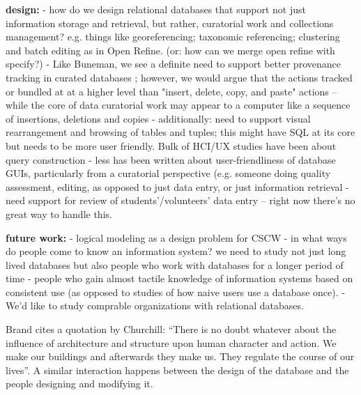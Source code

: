 \textbf{design: }
- how do we design relational databases that support not just information storage and retrieval, but rather,  curatorial work and collections management? e.g. things like georeferencing; taxonomic referencing; clustering and batch editing as in Open Refine. (or: how can we merge open refine with specify?)
- Like Buneman, we see a definite need to support better provenance tracking in curated databases \cite{Buneman_2006}; however, we would argue that the actions tracked or bundled at at a higher level than "insert, delete, copy, and paste" actions -- while the core of data curatorial work may appear to a computer like a sequence of insertions, deletions and copies
- additionally: need to support visual rearrangement and browsing of tables and tuples; this might have SQL at its core but needs to be more user friendly. Bulk of HCI/UX studies have been about query construction - less has been written about user-friendliness of database GUIs, particularly from a curatorial perspective (e.g. someone doing quality assessment, editing, as opposed to just data entry, or just information retrieval
- need support for review of students'/volunteers' data entry  -- right now there's no great way to handle this.

\textbf{future work:}
- logical modeling as a design problem for CSCW
- in what ways do people come to know an information system? we need to study not just long lived databases but also people who work with databases for a longer period of time - people who gain almost tactile knowledge of information systems based on consistent use (as opposed to studies of how naive users use a database once).
- We'd like to study comprable organizations with relational databases.

Brand cites a quotation by Churchill: “There is no doubt whatever about the influence of architecture and structure upon human character and action. We make our buildings and afterwards they make us. They regulate the course of our lives”. A similar interaction happens between the design of the database and the people designing and modifying it.

